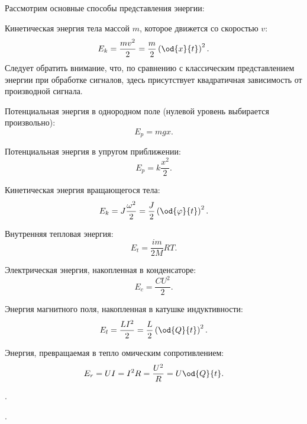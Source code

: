 Рассмотрим основные способы представления энергии:

Кинетическая энергия тела массой $m$, которое движется со скоростью $v$:
%
\begin{equation}
  E_k = \frac{mv^2}{2} = \frac{m}{2} \left( \od{x}{t} \right)^2.
  \label{atu:eq:Ek_v}
\end{equation}
%
Следует обратить внимание, что, по сравнению с классическим
представлением энергии при обработке сигналов,
здесь присутствует квадратичная зависимость от производной сигнала.

Потенциальная энергия в однородном поле (нулевой уровень выбирается произвольно):
%
\begin{equation}
  E_p = m g x .
  \label{atu:eq:Ep_g}
\end{equation}

Потенциальная энергия в упругом приближении:
%
\begin{equation}
  E_p = k \frac{x^2}{2} .
  \label{atu:eq:Ep_spring}
\end{equation}

Кинетическая энергия вращающегося тела:
%
\begin{equation}
  E_k = J \frac{\omega^2}{2} = \frac{J}{2} \left( \od{\varphi}{t} \right)^2 .
  \label{atu:eq:Ek_spin}
\end{equation}

Внутренняя тепловая энергия:
%
\begin{equation}
  E_t = \frac{im}{2M} RT.
  \label{atu:eq:Et}
\end{equation}

Электрическая энергия, накопленная в конденсаторе:
%
\begin{equation}
  E_c = \frac{C U^2}{2}.
  \label{atu:eq:Ec}
\end{equation}

Энергия магнитного поля, накопленная в катушке индуктивности:
%
\begin{equation}
  E_l = \frac{L I^2}{2} = \frac{L}{2} \left( \od{Q}{t}\right)^2 .
  \label{atu:eq:El}
\end{equation}

Энергия, превращаемая в тепло омическим сопротивлением:
%
\begin{equation}
  E_r = U I = I^2 R = \frac{U^2}{R} = U \od{Q}{t} .
  \label{atu:eq:Er}
\end{equation}



.

.


